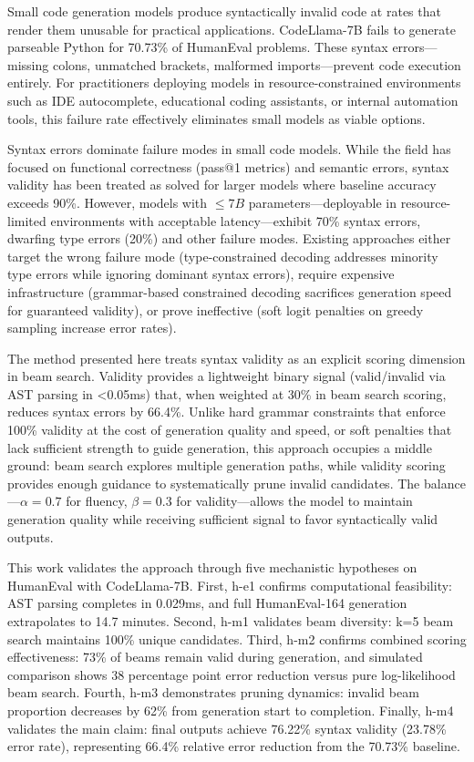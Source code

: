 
Small code generation models produce syntactically invalid code at rates that render them unusable for practical applications. CodeLlama-7B fails to generate parseable Python for 70.73\% of HumanEval problems. These syntax errors---missing colons, unmatched brackets, malformed imports---prevent code execution entirely. For practitioners deploying models in resource-constrained environments such as IDE autocomplete, educational coding assistants, or internal automation tools, this failure rate effectively eliminates small models as viable options.

Syntax errors dominate failure modes in small code models. While the field has focused on functional correctness (pass@1 metrics) and semantic errors, syntax validity has been treated as solved for larger models where baseline accuracy exceeds 90\%. However, models with $\leq 7B$ parameters---deployable in resource-limited environments with acceptable latency---exhibit 70\% syntax errors, dwarfing type errors (20\%) and other failure modes. Existing approaches either target the wrong failure mode (type-constrained decoding addresses minority type errors while ignoring dominant syntax errors), require expensive infrastructure (grammar-based constrained decoding sacrifices generation speed for guaranteed validity), or prove ineffective (soft logit penalties on greedy sampling increase error rates).

The method presented here treats syntax validity as an explicit scoring dimension in beam search. Validity provides a lightweight binary signal (valid/invalid via AST parsing in <0.05ms) that, when weighted at 30\% in beam search scoring, reduces syntax errors by 66.4\%. Unlike hard grammar constraints that enforce 100\% validity at the cost of generation quality and speed, or soft penalties that lack sufficient strength to guide generation, this approach occupies a middle ground: beam search explores multiple generation paths, while validity scoring provides enough guidance to systematically prune invalid candidates. The balance---$\alpha =0.7$ for fluency, $\beta =0.3$ for validity---allows the model to maintain generation quality while receiving sufficient signal to favor syntactically valid outputs.

This work validates the approach through five mechanistic hypotheses on HumanEval with CodeLlama-7B. First, h-e1 confirms computational feasibility: AST parsing completes in 0.029ms, and full HumanEval-164 generation extrapolates to 14.7 minutes. Second, h-m1 validates beam diversity: k=5 beam search maintains 100\% unique candidates. Third, h-m2 confirms combined scoring effectiveness: 73\% of beams remain valid during generation, and simulated comparison shows 38 percentage point error reduction versus pure log-likelihood beam search. Fourth, h-m3 demonstrates pruning dynamics: invalid beam proportion decreases by 62\% from generation start to completion. Finally, h-m4 validates the main claim: final outputs achieve 76.22\% syntax validity (23.78\% error rate), representing 66.4\% relative error reduction from the 70.73\% baseline.

